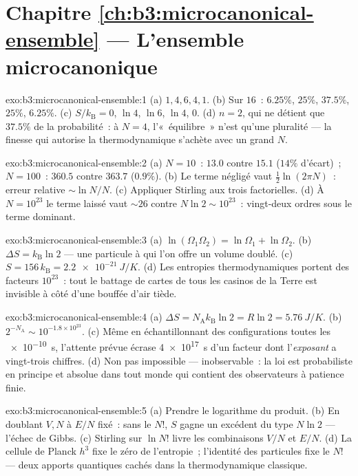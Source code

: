 \section*{Chapitre \ref{ch:b3:microcanonical-ensemble} --- L'ensemble microcanonique}

\begin{solution}{exo:b3:microcanonical-ensemble:1}
(a) $1, 4, 6, 4, 1$. (b) Sur $16$~: $6.25\%$, $25\%$, $37.5\%$,
$25\%$, $6.25\%$. (c) $S/k_{\text{B}} = 0$, $\ln4$, $\ln6$, $\ln4$,
$0$. (d) $n = 2$, qui ne détient que $37.5\%$ de la probabilité~: à
$N = 4$, l'«~équilibre~» n'est qu'une pluralité --- la finesse qui
autorise la thermodynamique s'achète avec un grand $N$.
\end{solution}

\begin{solution}{exo:b3:microcanonical-ensemble:2}
(a) $N = 10$~: $13.0$ contre $15.1$ ($14\%$ d'écart)~; $N = 100$~:
$360.5$ contre $363.7$ ($0.9\%$). (b) Le terme négligé vaut
$\tfrac12\ln(2\pi N)$~: erreur relative $\sim\ln N/N$. (c) Appliquer
Stirling aux trois factorielles. (d) À $N = 10^{23}$ le terme laissé
vaut $\sim26$ contre $N\ln2 \sim 10^{23}$~: vingt-deux ordres sous le
terme dominant.
\end{solution}

\begin{solution}{exo:b3:microcanonical-ensemble:3}
(a) $\ln(\Omega_1\Omega_2) = \ln\Omega_1 + \ln\Omega_2$. (b)
$\Delta S = k_{\text{B}}\ln2$ --- une particule à qui l'on offre un
volume doublé. (c) $S = 156\,k_{\text{B}} = \qty{2.2e-21}{J/K}$. (d)
Les entropies thermodynamiques portent des facteurs $10^{23}$~: tout
le battage de cartes de tous les casinos de la Terre est invisible à
côté d'une bouffée d'air tiède.
\end{solution}

\begin{solution}{exo:b3:microcanonical-ensemble:4}
(a) $\Delta S = N_{\text{A}}k_{\text{B}}\ln2 = R\ln2 =
\qty{5.76}{J/K}$. (b) $2^{-N_{\text{A}}} \sim 10^{-1.8\times
10^{23}}$. (c) Même en échantillonnant des configurations toutes les
\qty{e-10}{s}, l'attente prévue écrase \qty{4e17}{s} d'un facteur dont
l'\emph{exposant} a vingt-trois chiffres. (d) Non pas impossible ---
inobservable~: la loi est probabiliste en principe et absolue dans
tout monde qui contient des observateurs à patience finie.
\end{solution}

\begin{solution}{exo:b3:microcanonical-ensemble:5}
(a) Prendre le logarithme du produit. (b) En doublant $V, N$ à $E/N$
fixé~: sans le $N!$, $S$ gagne un excédent du type $N\ln2$ --- l'échec
de Gibbs. (c) Stirling sur $\ln N!$ livre les combinaisons $V/N$ et
$E/N$. (d) La cellule de Planck $h^3$ fixe le zéro de l'entropie~;
l'identité des particules fixe le $N!$ --- deux apports quantiques
cachés dans la thermodynamique classique.
\end{solution}

